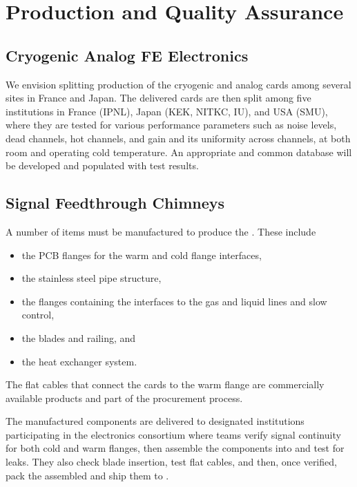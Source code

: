 \section{Production and Quality Assurance}
\label{sec:dp-tpcelec-production}


\subsection{Cryogenic Analog FE Electronics}
\label{ssec:dp-tpcelec-prod-cryofe}
We envision splitting production of the cryogenic  and analog  cards among several sites in France and Japan. The delivered cards are then split among five institutions in France (IPNL), Japan (KEK, NITKC, IU), and USA (SMU), where they are tested for various performance parameters such as noise levels, dead channels, hot channels, and gain and its uniformity across channels, at both room and operating cold temperature. An appropriate and common database will be developed and populated with test results. 

\subsection{Signal Feedthrough Chimneys}
\label{ssec:dp-tpcelec-prod-sft}

A number of items must be manufactured to produce the . These include 
\begin{itemize}
\item the PCB flanges for the warm and cold \fdth flange interfaces, 
\item the stainless steel pipe structure, 
\item the flanges containing the interfaces to the gas and liquid lines and slow control, 
\item the blades and railing, and 
\item the heat exchanger system. 
\end{itemize}
The flat cables that connect the  cards to the warm flange are commercially available products and part of the  procurement process. 

The manufactured components are delivered to designated institutions participating in the \dual electronics consortium where teams verify signal continuity for both cold and warm flanges, then assemble the components into  and test for leaks. They also check blade insertion, test flat cables, and then, once verified, pack the assembled  and ship them to . 

